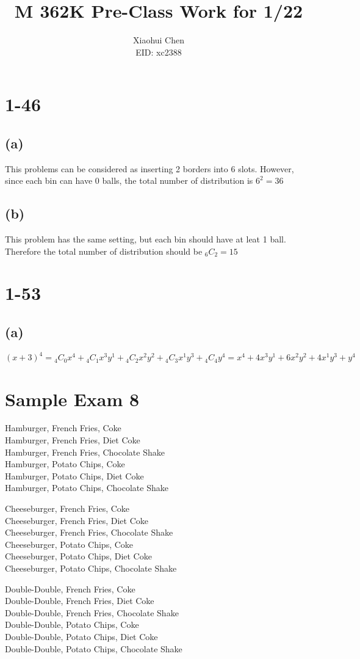 \documentclass[12pt]{article}
\author{Xiaohui Chen \\EID: xc2388}
\title{M 362K Pre-Class Work for 1/22}
\begin{document}
\maketitle
\begin{spacing}{2.0}

\section*{1-46}
\subsection*{(a)}
This problems can be considered as inserting 2 borders into 6 slots. However, since each bin can have 0 balls, the total number of distribution is $6^2=36$

\subsection*{(b)}
This problem has the same setting, but each bin should have at leat 1 ball. Therefore the total number of distribution should be ${}_{6}C_{2}= 15$


\section*{1-53}
\subsection*{(a)}
$(x+3)^4= {}_{4}C_{0} x^4+ {}_{4}C_{1} x^3y^1+ {}_{4}C_{2}x^2y^2+ {}_{4}C_{3}x^1y^3 + {}_{4}C_{4}y^4= x^4+ 4x^3y^1 + 6x^2y^2 +4x^1y^3+ y^4$

\section*{Sample Exam 8}
Hamburger, French Fries, Coke\\
Hamburger, French Fries, Diet Coke\\
Hamburger, French Fries, Chocolate Shake\\
Hamburger, Potato Chips, Coke\\
Hamburger, Potato Chips, Diet Coke\\
Hamburger, Potato Chips, Chocolate Shake

Cheeseburger, French Fries, Coke\\
Cheeseburger, French Fries, Diet Coke\\
Cheeseburger, French Fries, Chocolate Shake\\
Cheeseburger, Potato Chips, Coke\\
Cheeseburger, Potato Chips, Diet Coke\\
Cheeseburger, Potato Chips, Chocolate Shake

Double-Double, French Fries, Coke\\
Double-Double, French Fries, Diet Coke\\
Double-Double, French Fries, Chocolate Shake\\
Double-Double, Potato Chips, Coke\\
Double-Double, Potato Chips, Diet Coke\\
Double-Double, Potato Chips, Chocolate Shake



\end{spacing}
\end{document}
